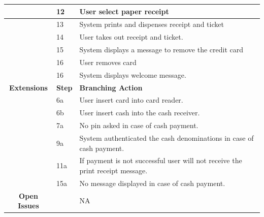 \documentclass[a4paper,12pt]{report}
\begin{document}
\begin{tabular}{ | c | p{2cm} | p{7cm} |}
	\hline
	&  12  & User select paper receipt \\
	\hline
	&  13  & System prints and dispenses receipt and ticket \\
	\hline
	&  14  & User takes out receipt and ticket. \\
	\hline
	&  15  & System displays a message to remove the credit card \\
	\hline
	&  16  & User removes card \\
	\hline
	&  16  & System displays welcome message. \\
	\hline
	\textbf{Extensions} & \textbf{Step} & \textbf{Branching Action} \\
	\hline
	&  6a  & User insert card into card reader. \\
	\hline
	&  6b  & User insert cash into the cash receiver. \\
	\hline
	&  7a  & No pin asked in case of cash payment. \\
	\hline
	&  9a  & System authenticated the cash denominations in case of cash payment. \\
	\hline
	&  11a  & If payment is not successful user will not receive the print receipt message. \\
	\hline
	&  15a  & No message displayed in case of cash payment. \\
	\hline
	\textbf{Open Issues} &    & NA \\
	\hline
	
\end{tabular}



\printglossaries
\end{document}
